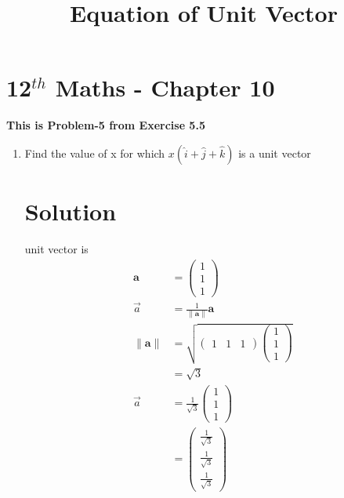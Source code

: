 \documentclass[12pt]{article}
\providecommand{\norm}[1]{\left\lVert#1\right\rVert}
\newcommand{\myvec}[1]{\ensuremath{\begin{pmatrix}#1\end{pmatrix}}}
\let\vec\mathbf
\begin{document}
\begin{center}
\title{\textbf{Equation  of Unit Vector}}
\date{\vspace{-5ex}} %
\maketitle
\end{center}
\setcounter{page}{1}
\section{12$^{th}$ Maths - Chapter 10}
\textbf{This is Problem-5 from Exercise 5.5}
\begin{enumerate}
\item Find the value of x for which $x(\hat{i}+\hat{j}+\hat{k})$ is a unit vector
\section{Solution}
unit vector is
\begin{align} 
\vec{a}&=\myvec{1\\1\\1}\\
\overrightarrow{a} &=\frac{1}{\norm{\vec{a}}}\vec{a}\\
\norm{\vec{a}}&=\sqrt{\myvec{1& 1& 1}\myvec{1\\1\\1}}\\
&=\sqrt{3}\\
\overrightarrow{a}&=\frac{1}{\sqrt{3}}\myvec{1\\1\\1}\\
&=\myvec{\frac{1}{\sqrt{3}}\\[2pt] \frac{1}{\sqrt{3}}\\[2pt] \frac{1}{\sqrt{3}}}
\end{align}	  
\end{enumerate} 
\end{document}
